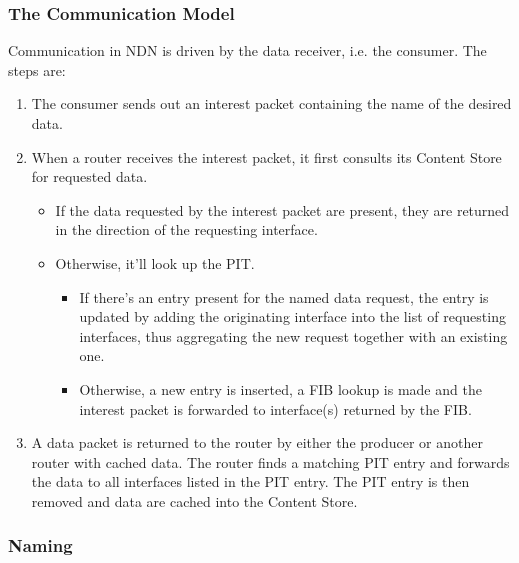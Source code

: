             \subsubsection{The Communication Model}

                Communication in NDN is driven by the data receiver, i.e. the consumer. The steps are:

                \begin{enumerate}
                    \item The consumer sends out an interest packet containing the name of the desired data.
                    \item When a router receives the interest packet, it first consults its Content Store for requested data.
                        \begin{itemize}
                            \item If the data requested by the interest packet are present, they are returned in the direction of the requesting interface.
                            \item Otherwise, it'll look up the PIT.
                            \begin{itemize}
                                \item If there's an entry present for the named data request, the entry is updated by adding the originating interface into the list of requesting interfaces, thus aggregating the new request together with an existing one.
                                \item Otherwise, a new entry is inserted, a FIB lookup is made and the interest packet is forwarded to interface(s) returned by the FIB.
                            \end{itemize}
                        \end{itemize}
                    \item A data packet is returned to the router by either the producer or another router with cached data. The router finds a matching PIT entry and forwards the data to all interfaces listed in the PIT entry. The PIT entry is then removed and data are cached into the Content Store.
                \end{enumerate}

            \subsubsection{Naming}

